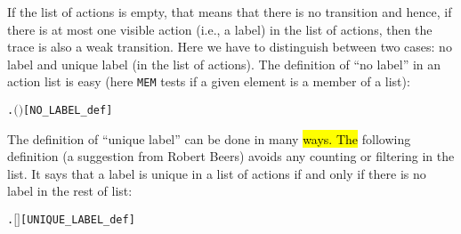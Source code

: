 If the list of actions is empty, that means that there is no transition and hence,
if there is at most one visible action (i.e., a label) in the list of actions,
then the trace is also a weak transition. Here
we have to distinguish between two cases: no label and unique label (in
the list of actions). The definition of ``no
label'' in an action list is easy (here \texttt{MEM} tests if a given element is a member of a list):
\begin{alltt}
     \HOLSymConst{\HOLTokenDefEquality{}} \HOLSymConst{\HOLTokenNeg{}}\HOLSymConst{\HOLTokenExists{}}.  \ensuremath{(} \ensuremath{)} \hfill{[NO_LABEL_def]}
\end{alltt}

The definition of ``unique label'' can be done in many \hl{ways. The}
following definition (a suggestion from Robert Beers)
avoids any counting or filtering in the list.
It says that a label is unique in a list of actions if and only if there is no
label in the rest of list:
\begin{alltt}
      \HOLSymConst{\HOLTokenDefEquality{}}
     \HOLSymConst{\HOLTokenExists{}} .  \HOLSymConst{\HOLTokenDoublePlus} \ensuremath{[}\ensuremath{]} \HOLSymConst{\HOLTokenDoublePlus}  \HOLSymConst{\ensuremath{=}}  \HOLSymConst{\HOLTokenConj{}}   \HOLSymConst{\HOLTokenConj{}}  \hfill{[UNIQUE_LABEL_def]}
\end{alltt}

